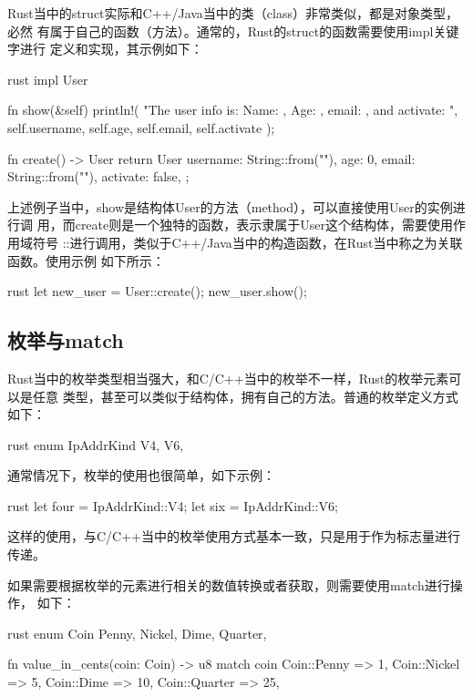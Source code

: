 Rust当中的struct实际和C++/Java当中的类（class）非常类似，都是对象类型，必然
有属于自己的函数（方法）。通常的，Rust的struct的函数需要使用impl关键字进行
定义和实现，其示例如下：
\begin{code-block}{rust}
impl User {
    fn show(&self) {
        println!(
            "The user info is: Name: {}, Age: {}, email: {}, and activate: {}",
            self.username, self.age, self.email, self.activate
        );
    }

    fn create() -> User {
        return User {
            username: String::from(""),
            age: 0,
            email: String::from(""),
            activate: false,
        };
    }
}
\end{code-block}
上述例子当中，show是结构体User的方法（method），可以直接使用User的实例进行调
用，而create则是一个独特的函数，表示隶属于User这个结构体，需要使用作用域符号
::进行调用，类似于C++/Java当中的构造函数，在Rust当中称之为关联函数。使用示例
如下所示：
\begin{code-block}{rust}
let new_user = User::create();
new_user.show();
\end{code-block}

\subsection{枚举与match}
Rust当中的枚举类型相当强大，和C/C++当中的枚举不一样，Rust的枚举元素可以是任意
类型，甚至可以类似于结构体，拥有自己的方法。普通的枚举定义方式如下：
\begin{code-block}{rust}
enum IpAddrKind {
    V4,
    V6,
}
\end{code-block}
通常情况下，枚举的使用也很简单，如下示例：
\begin{code-block}{rust}
let four = IpAddrKind::V4;
let six = IpAddrKind::V6;
\end{code-block}
这样的使用，与C/C++当中的枚举使用方式基本一致，只是用于作为标志量进行传递。

如果需要根据枚举的元素进行相关的数值转换或者获取，则需要使用match进行操作，
如下：
\begin{code-block}{rust}
enum Coin {
    Penny,
    Nickel,
    Dime,
    Quarter,
}

fn value_in_cents(coin: Coin) -> u8 {
    match coin {
        Coin::Penny => 1,
        Coin::Nickel => 5,
        Coin::Dime => 10,
        Coin::Quarter => 25,
    }
}
\end{code-block}

